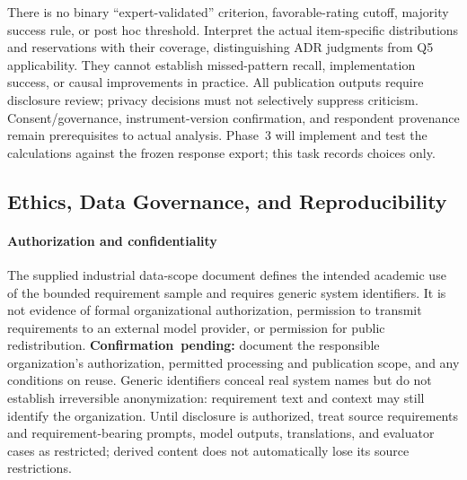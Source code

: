 There is no binary ``expert-validated'' criterion, favorable-rating cutoff,
majority success rule, or post hoc threshold. Interpret the actual
item-specific distributions and reservations with their coverage, distinguishing
ADR judgments from Q5 applicability. They cannot establish missed-pattern
recall, implementation success, or causal improvements in practice.
All publication outputs require disclosure review; privacy decisions must
not selectively suppress criticism. Consent/governance, instrument-version
confirmation, and respondent provenance remain prerequisites to actual
analysis. Phase~3 will implement and test the calculations against the frozen
response export; this task records choices only.


\subsection{Ethics, Data Governance, and Reproducibility}
\label{sec:ethics-reproducibility}

\paragraph{Authorization and confidentiality}
The supplied industrial data-scope document defines the intended academic use
of the bounded requirement sample and requires generic system identifiers.
It is not evidence of formal organizational authorization, permission to
transmit requirements to an external model provider, or permission for public
redistribution. \mbox{\textbf{Confirmation pending:}} document the responsible
organization's authorization, permitted processing and publication scope,
and any conditions on reuse. Generic identifiers conceal real system names
but do not establish irreversible anonymization: requirement text and
context may still identify the organization. Until disclosure is authorized,
treat source requirements and requirement-bearing prompts, model outputs,
translations, and evaluator cases as restricted; derived content does not
automatically lose its source restrictions.

